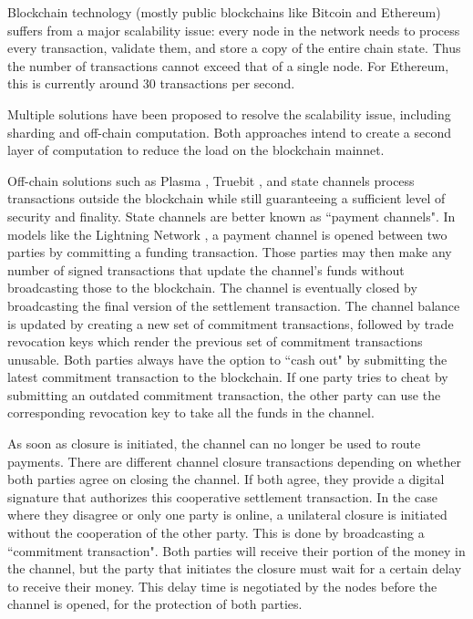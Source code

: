 Blockchain technology (mostly public blockchains like Bitcoin and Ethereum) suffers from a major scalability issue: every node in the network needs to process every transaction, validate them, and store a copy of the entire chain state. Thus the number of transactions cannot exceed that of a single node. For Ethereum, this is currently around 30 transactions per second.

Multiple solutions have been proposed to resolve the scalability issue, including sharding and off-chain computation. Both approaches intend to create a second layer of computation to reduce the load on the blockchain mainnet.

Off-chain solutions such as Plasma \cite{plasma}, Truebit \cite{truebit}, and state channels process transactions outside the blockchain while still guaranteeing a sufficient level of security and finality. State channels are better known as ``payment channels". In models like the Lightning Network \cite{lightningnetwork}, a payment channel is opened between two parties by committing a funding transaction. Those parties may then make any number of signed transactions that update the channel's funds without broadcasting those to the blockchain. The channel is eventually closed by broadcasting the final version of the settlement transaction. The channel balance is updated by creating a new set of commitment transactions, followed by trade revocation keys which render the previous set of commitment transactions unusable. Both parties always have the option to ``cash out" by submitting the latest commitment transaction to the blockchain. If one party tries to cheat by submitting an outdated commitment transaction, the other party can use the corresponding revocation key to take all the funds in the channel.

As soon as closure is initiated, the channel can no longer be used to route payments. There are different channel closure transactions depending on whether both parties agree on closing the channel. If both agree, they provide a digital signature that authorizes this cooperative settlement transaction. In the case where they disagree or only one party is online, a unilateral closure is initiated without the cooperation of the other party. This is done by broadcasting a ``commitment transaction". Both parties will receive their portion of the money in the channel, but the party that initiates the closure must wait for a certain delay to receive their money. This delay time is negotiated by the nodes before the channel is opened, for the protection of both parties.

